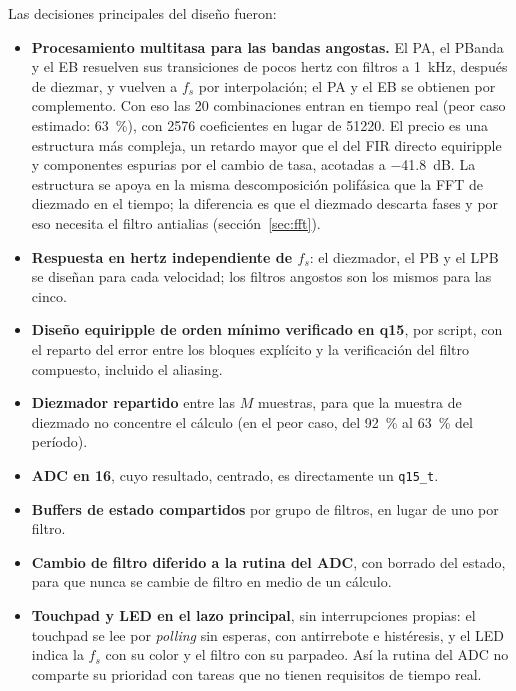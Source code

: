 \documentclass[11pt,a4paper]{article}
\begin{document}
Las decisiones principales del diseño fueron:
\begin{itemize}[nosep]
  \item \textbf{Procesamiento multitasa para las bandas angostas.} El PA, el
        PBanda y el EB resuelven sus transiciones de pocos hertz con filtros
        a \qty{1}{\kilo\hertz}, después de diezmar, y vuelven a $f_s$ por
        interpolación; el PA y el EB se obtienen por complemento. Con eso las
        20 combinaciones entran en tiempo real (peor caso estimado:
        \qty{63}{\percent}), con \num{2576} coeficientes en lugar de
        \num{51220}. El precio es una estructura más compleja, un retardo
        mayor que el del FIR directo equiripple y componentes espurias por el
        cambio de tasa, acotadas a \qty{-41.8}{\deci\bel}. La estructura se
        apoya en la misma descomposición polifásica que la FFT de diezmado
        en el tiempo; la diferencia es que el diezmado descarta fases y por
        eso necesita el filtro antialias (sección~\ref{sec:fft}).
  \item \textbf{Respuesta en hertz independiente de $f_s$}: el diezmador, el
        PB y el LPB se diseñan para cada velocidad; los filtros angostos son
        los mismos para las cinco.
  \item \textbf{Diseño equiripple de orden mínimo verificado en q15}, por
        script, con el reparto del error entre los bloques explícito y la
        verificación del filtro compuesto, incluido el aliasing.
  \item \textbf{Diezmador repartido} entre las $M$ muestras, para que la
        muestra de diezmado no concentre el cálculo (en el peor caso, del
        \qty{92}{\percent} al \qty{63}{\percent} del período).
  \item \textbf{ADC en \qty{16}{\bit}}, cuyo resultado, centrado, es
        directamente un \texttt{q15\_t}.
  \item \textbf{Buffers de estado compartidos} por grupo de filtros, en lugar
        de uno por filtro.
  \item \textbf{Cambio de filtro diferido a la rutina del ADC}, con borrado
        del estado, para que nunca se cambie de filtro en medio de un cálculo.
  \item \textbf{Touchpad y LED en el lazo principal}, sin interrupciones
        propias: el touchpad se lee por \emph{polling} sin esperas, con
        antirrebote e histéresis, y el LED indica la $f_s$ con su color y el
        filtro con su parpadeo. Así la rutina del ADC no comparte su
        prioridad con tareas que no tienen requisitos de tiempo real.
\end{itemize}
\end{document}
